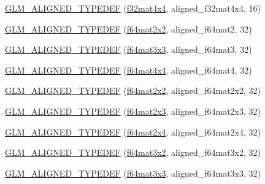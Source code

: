 \begin{DoxyCompactItemize}
\item 
\hyperlink{group__gtx__type__aligned_gacc429b3b0b49921e12713b6d31e14e1d}{G\+L\+M\+\_\+\+A\+L\+I\+G\+N\+E\+D\+\_\+\+T\+Y\+P\+E\+D\+E\+F} (\hyperlink{group__gtc__type__precision_gac4a4b2671cbf50ab95c55fce2bfcd811}{f32mat4x4}, aligned\+\_\+f32mat4x4, 16)
\item 
\hyperlink{group__gtx__type__aligned_ga88f6c6fa06e6e64479763e69444669cf}{G\+L\+M\+\_\+\+A\+L\+I\+G\+N\+E\+D\+\_\+\+T\+Y\+P\+E\+D\+E\+F} (\hyperlink{group__gtc__type__precision_ga1e14d8b4e18898be51cd719fda213dcc}{f64mat2x2}, aligned\+\_\+f64mat2, 32)
\item 
\hyperlink{group__gtx__type__aligned_gaae8e4639c991e64754145ab8e4c32083}{G\+L\+M\+\_\+\+A\+L\+I\+G\+N\+E\+D\+\_\+\+T\+Y\+P\+E\+D\+E\+F} (\hyperlink{group__gtc__type__precision_gab272e67eb87cc1e8233237480c2aa8d2}{f64mat3x3}, aligned\+\_\+f64mat3, 32)
\item 
\hyperlink{group__gtx__type__aligned_ga6e9094f3feb3b5b49d0f83683a101fde}{G\+L\+M\+\_\+\+A\+L\+I\+G\+N\+E\+D\+\_\+\+T\+Y\+P\+E\+D\+E\+F} (\hyperlink{group__gtc__type__precision_ga6b1ada50de2fc7d991138ab857fb2476}{f64mat4x4}, aligned\+\_\+f64mat4, 32)
\item 
\hyperlink{group__gtx__type__aligned_gadbd2c639c03de1c3e9591b5a39f65559}{G\+L\+M\+\_\+\+A\+L\+I\+G\+N\+E\+D\+\_\+\+T\+Y\+P\+E\+D\+E\+F} (\hyperlink{group__gtc__type__precision_ga1e14d8b4e18898be51cd719fda213dcc}{f64mat2x2}, aligned\+\_\+f64mat2x2, 32)
\item 
\hyperlink{group__gtx__type__aligned_gab059d7b9fe2094acc563b7223987499f}{G\+L\+M\+\_\+\+A\+L\+I\+G\+N\+E\+D\+\_\+\+T\+Y\+P\+E\+D\+E\+F} (\hyperlink{group__gtc__type__precision_ga6d0196bded514d55e26e0f68dd38b37b}{f64mat2x3}, aligned\+\_\+f64mat2x3, 32)
\item 
\hyperlink{group__gtx__type__aligned_gabbc811d1c52ed2b8cfcaff1378f75c69}{G\+L\+M\+\_\+\+A\+L\+I\+G\+N\+E\+D\+\_\+\+T\+Y\+P\+E\+D\+E\+F} (\hyperlink{group__gtc__type__precision_gaf18b9f693f2ef743d93c9afd5cfbe229}{f64mat2x4}, aligned\+\_\+f64mat2x4, 32)
\item 
\hyperlink{group__gtx__type__aligned_ga9ddf5212777734d2fd841a84439f3bdf}{G\+L\+M\+\_\+\+A\+L\+I\+G\+N\+E\+D\+\_\+\+T\+Y\+P\+E\+D\+E\+F} (\hyperlink{group__gtc__type__precision_ga0039ae03558b5242466f4c344c3c7d65}{f64mat3x2}, aligned\+\_\+f64mat3x2, 32)
\item 
\hyperlink{group__gtx__type__aligned_gad1dda32ed09f94bfcf0a7d8edfb6cf13}{G\+L\+M\+\_\+\+A\+L\+I\+G\+N\+E\+D\+\_\+\+T\+Y\+P\+E\+D\+E\+F} (\hyperlink{group__gtc__type__precision_gab272e67eb87cc1e8233237480c2aa8d2}{f64mat3x3}, aligned\+\_\+f64mat3x3, 32)

\end{DoxyCompactItemize}
